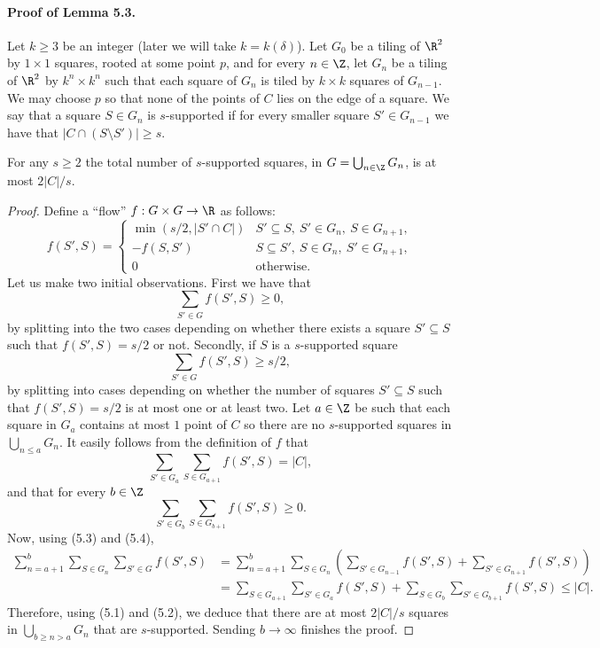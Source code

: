 \paragraph{Proof of Lemma 5.3.}
Let $k\ge3$ be an integer (later we will take $k=k(\delta)$). Let $G_0$ be a tiling of $\R^2$ by $1\times1$ squares, rooted at some point $p$, and for every $n\in\Z$, let $G_n$ be a tiling of $\R^2$ by $k^n\times k^n$ such that each square of $G_n$ is tiled by $k\times k$ squares of $G_{n-1}$. We may choose $p$ so that none of the points of $C$ lies on the edge of a square.
We say that a square $S\in G_n$ is $s$-supported if for every smaller square $S'\in G_{n-1}$ we have that $|C\cap(S\setminus S')|\ge s$.
\begin{claim}[5.5]
For any $s\ge2$ the total number of $s$-supported squares, in $G=\bigcup_{n\in\Z}G_n$, is at most $2|C|/s$.
\end{claim}
\begin{proof}
Define a ``flow'' $f:G\times G\to\R$ as follows:
\[
f(S',S)=\begin{cases}
\min(s/2,|S'\cap C|)&S'\subseteq S,\ S'\in G_n,\ S\in G_{n+1},\\
-f(S,S')&S\subseteq S',\ S\in G_n,\ S'\in G_{n+1},\\
0&\text{otherwise}.
\end{cases}
\]
Let us make two initial observations. First we have that
\[
\sum_{S'\in G}f(S',S)\ge0,\tag{5.1}
\]
by splitting into the two cases depending on whether there exists a square $S'\subseteq S$ such that $f(S',S)=s/2$ or not. Secondly, if $S$ is a $s$-supported square
\[
\sum_{S'\in G}f(S',S)\ge s/2,\tag{5.2}
\]
by splitting into cases depending on whether the number of squares $S'\subseteq S$ such that $f(S',S)=s/2$ is at most one or at least two.
Let $a\in\Z$ be such that each square in $G_a$ contains at most $1$ point of $C$ so there are no $s$-supported squares in $\bigcup_{n\le a}G_n$. It easily follows from the definition of $f$ that
\[
\sum_{S'\in G_a}\sum_{S\in G_{a+1}}f(S',S)=|C|,\tag{5.3}
\]
and that for every $b\in\Z$
\[
\sum_{S'\in G_b}\sum_{S\in G_{b+1}}f(S',S)\ge0.\tag{5.4}
\]
Now, using (5.3) and (5.4),
\begin{align*}
\sum_{n=a+1}^b\sum_{S\in G_n}\sum_{S'\in G}f(S',S)
&=\sum_{n=a+1}^b\sum_{S\in G_n}\left(\sum_{S'\in G_{n-1}}f(S',S)+\sum_{S'\in G_{n+1}}f(S',S)\right)\\
&=\sum_{S\in G_{a+1}}\sum_{S'\in G_a}f(S',S)
+\sum_{S\in G_b}\sum_{S'\in G_{b+1}}f(S',S)\le|C|.
\end{align*}
Therefore, using (5.1) and (5.2), we deduce that there are at most $2|C|/s$ squares in $\bigcup_{b\ge n>a}G_n$ that are $s$-supported. Sending $b\to\infty$ finishes the proof.
\end{proof}
